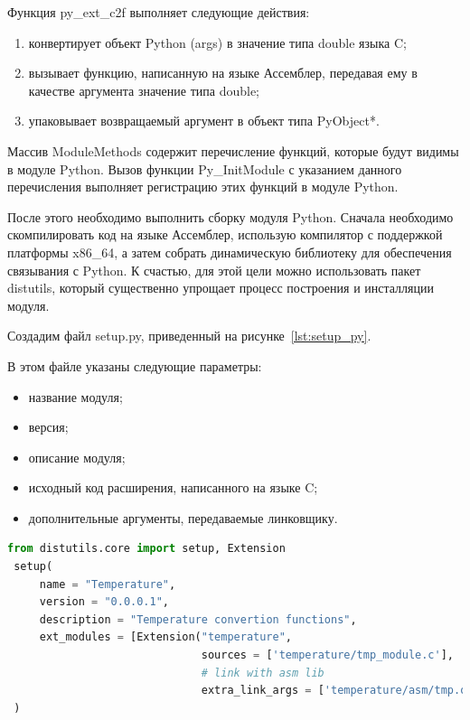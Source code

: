 Функция py\_ext\_c2f выполняет следующие действия:

\begin{enumerate}
\item конвертирует объект Python (args) в значение типа double языка C;
\item вызывает функцию, написанную на языке Ассемблер, 
  передавая ему в качестве аргумента значение типа double;
\item упаковывает возвращаемый аргумент в объект типа PyObject*. 
\end{enumerate}

Массив ModuleMethods содержит перечисление функций, которые будут видимы 
в модуле Python. 
Вызов функции Py\_InitModule с указанием данного перечисления выполняет регистрацию
этих функций в модуле Python.

После этого необходимо выполнить сборку модуля Python. 
Сначала необходимо скомпилировать код на языке Ассемблер, использую компилятор с
поддержкой платформы x86\_64, а затем собрать динамическую библиотеку для
обеспечения связывания с Python.
К счастью, для этой цели можно использовать пакет distutils, который
существенно упрощает процесс построения и инсталляции модуля.

Создадим файл setup.py, приведенный на рисунке~\ref{lst:setup_py}.

В этом файле указаны следующие параметры:
\begin{itemize}
\item название модуля;
\item версия;
\item описание модуля;
\item исходный код расширения, написанного на языке C;
\item дополнительные аргументы, передаваемые линковщику.
\end{itemize}

\begin{lstlisting}[caption=Параметры создания модуля Python,
label=lst:setup_py,language={Python},basicstyle=\scriptsize\ttfamily]
 from distutils.core import setup, Extension 
 setup(
     name = "Temperature",
     version = "0.0.0.1",
     description = "Temperature convertion functions",
     ext_modules = [Extension("temperature",
                              sources = ['temperature/tmp_module.c'],
                              # link with asm lib
                              extra_link_args = ['temperature/asm/tmp.o']),],
 )
\end{lstlisting}

